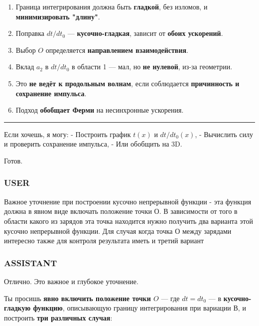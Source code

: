 \documentclass[11pt]{article}
\providecommand{\tightlist}{%
      \setlength{\itemsep}{0pt}\setlength{\parskip}{0pt}}
\begin{document}
\begin{enumerate}
\def\labelenumi{\arabic{enumi}.}
\tightlist
\item
   Граница интегрирования должна быть \textbf{гладкой}, без изломов, и
  \textbf{минимизировать "длину"}.
\item
   Поправка \(dt/dt_0\) --- \textbf{кусочно-гладкая}, зависит от
  \textbf{обоих ускорений}.
\item
   Выбор \(O\) определяется \textbf{направлением взаимодействия}.
\item
   Вклад \(a_2\) в \(dt/dt_0\) в области 1 --- мал, но \textbf{не
  нулевой}, из-за геометрии.
\item
   Это \textbf{не ведёт к продольным волнам}, если соблюдается
  \textbf{причинность и сохранение импульса}.
\item
   Подход \textbf{обобщает Ферми} на несинхронные ускорения.
\end{enumerate}

\begin{center}\rule{0.5\linewidth}{\linethickness}\end{center}

Если хочешь, я могу: - Построить график \(t(x)\) и \(dt/dt_0(x)\), -
Вычислить силу и проверить сохранение импульса, - Или обобщить на 3D.

Готов.

    \subsubsection{USER}

Важное уточнение при построении кусочно непрерывной функции - эта
функция должна в явном виде включать положение точки О. В зависимости от
того в области какого из зарядов эта точка находится нужно получить два
варианта этой кусочно непрерывной функции. Для случая когда точка О
между зарядами интересно также для контроля результата иметь и третий
вариант

\subsubsection{ASSISTANT}

Отлично. Это важное и глубокое уточнение.

Ты просишь \textbf{явно включить положение точки \(O\)} --- где
\(dt = dt_0\) --- в \textbf{кусочно-гладкую функцию}, описывающую
границу интегрирования при вариации В, и построить \textbf{три различных
случая}:
\end{document}
